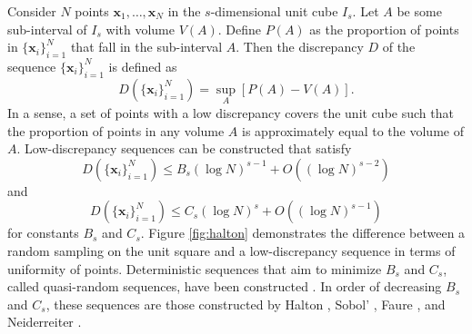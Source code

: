 \documentclass{article}
\begin{document}
Consider $N$ points $\mathbf{x}_1,\dots,\mathbf{x}_N$ in the $s$-dimensional unit cube $I_s$. Let $A$ be some sub-interval of $I_s$ with volume $V(A)$. Define $P(A)$ as the proportion of points in $\{\mathbf{x}_i\}_{i=1}^N$ that fall in the sub-interval $A$. Then the discrepancy $D$ of the sequence $\{\mathbf{x}_i\}_{i=1}^N$ is defined as
\begin{equation}
D\left(\{\mathbf{x}_i\}_{i=1}^N\right)=\sup_A\left[P(A)-V(A)\right].
\end{equation}In a sense, a set of points with a low discrepancy covers the unit cube such that the proportion of points in any volume $A$ is approximately equal to the volume of $A$. Low-discrepancy sequences can be constructed that satisfy
\begin{equation}
D\left(\{\mathbf{x}_i\}_{i=1}^N\right)\leq B_s(\log N)^{s-1}+O((\log N)^{s-2})
\end{equation}and 
\begin{equation}
D\left(\{\mathbf{x}_i\}_{i=1}^N\right)\leq C_s(\log N)^{s}+O((\log N)^{s-1})
\end{equation}for constants $B_s$ and $C_s$. Figure \ref{fig:halton} demonstrates the difference between a random sampling on the unit square and a low-discrepancy sequence in terms of uniformity of points. Deterministic sequences that aim to minimize $B_s$ and $C_s$, called quasi-random sequences, have been constructed \cite{niederreiter1988low}. In order of decreasing $B_s$ and $C_s$, these sequences are those constructed by Halton \cite{halton1960efficiency}, Sobol' \cite{soboldistribution}, Faure \cite{faure1982discrepance}, and Neiderreiter \cite{niederreiter1987point}.
\end{document}
